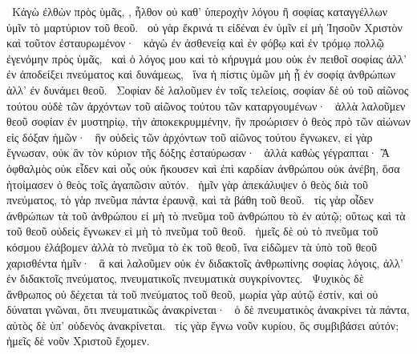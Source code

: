 ~Κἀγὼ ἐλθὼν πρὸς ὑμᾶς, , ἦλθον οὐ καθ’ ὑπεροχὴν λόγου ἢ σοφίας καταγγέλλων ὑμῖν τὸ μαρτύριον τοῦ θεοῦ.
~οὐ γὰρ ἔκρινά τι εἰδέναι ἐν ὑμῖν εἰ μὴ Ἰησοῦν Χριστὸν καὶ τοῦτον ἐσταυρωμένον·
~κἀγὼ ἐν ἀσθενείᾳ καὶ ἐν φόβῳ καὶ ἐν τρόμῳ πολλῷ ἐγενόμην πρὸς ὑμᾶς,
~καὶ ὁ λόγος μου καὶ τὸ κήρυγμά μου οὐκ ἐν πειθοῖ σοφίας ἀλλ’ ἐν ἀποδείξει πνεύματος καὶ δυνάμεως,
~ἵνα ἡ πίστις ὑμῶν μὴ ᾖ ἐν σοφίᾳ ἀνθρώπων ἀλλ’ ἐν δυνάμει θεοῦ.
~Σοφίαν δὲ λαλοῦμεν ἐν τοῖς τελείοις, σοφίαν δὲ οὐ τοῦ αἰῶνος τούτου οὐδὲ τῶν ἀρχόντων τοῦ αἰῶνος τούτου τῶν καταργουμένων·
~ἀλλὰ λαλοῦμεν θεοῦ σοφίαν ἐν μυστηρίῳ, τὴν ἀποκεκρυμμένην, ἣν προώρισεν ὁ θεὸς πρὸ τῶν αἰώνων εἰς δόξαν ἡμῶν·
~ἣν οὐδεὶς τῶν ἀρχόντων τοῦ αἰῶνος τούτου ἔγνωκεν, εἰ γὰρ ἔγνωσαν, οὐκ ἂν τὸν κύριον τῆς δόξης ἐσταύρωσαν·
~ἀλλὰ καθὼς γέγραπται· Ἃ ὀφθαλμὸς οὐκ εἶδεν καὶ οὖς οὐκ ἤκουσεν καὶ ἐπὶ καρδίαν ἀνθρώπου οὐκ ἀνέβη, ὅσα ἡτοίμασεν ὁ θεὸς τοῖς ἀγαπῶσιν αὐτόν.
~ἡμῖν γὰρ ἀπεκάλυψεν ὁ θεὸς διὰ τοῦ πνεύματος, τὸ γὰρ πνεῦμα πάντα ἐραυνᾷ, καὶ τὰ βάθη τοῦ θεοῦ.
~τίς γὰρ οἶδεν ἀνθρώπων τὰ τοῦ ἀνθρώπου εἰ μὴ τὸ πνεῦμα τοῦ ἀνθρώπου τὸ ἐν αὐτῷ; οὕτως καὶ τὰ τοῦ θεοῦ οὐδεὶς ἔγνωκεν εἰ μὴ τὸ πνεῦμα τοῦ θεοῦ.
~ἡμεῖς δὲ οὐ τὸ πνεῦμα τοῦ κόσμου ἐλάβομεν ἀλλὰ τὸ πνεῦμα τὸ ἐκ τοῦ θεοῦ, ἵνα εἰδῶμεν τὰ ὑπὸ τοῦ θεοῦ χαρισθέντα ἡμῖν·
~ἃ καὶ λαλοῦμεν οὐκ ἐν διδακτοῖς ἀνθρωπίνης σοφίας λόγοις, ἀλλ’ ἐν διδακτοῖς πνεύματος, πνευματικοῖς πνευματικὰ συγκρίνοντες.
~Ψυχικὸς δὲ ἄνθρωπος οὐ δέχεται τὰ τοῦ πνεύματος τοῦ θεοῦ, μωρία γὰρ αὐτῷ ἐστίν, καὶ οὐ δύναται γνῶναι, ὅτι πνευματικῶς ἀνακρίνεται·
~ὁ δὲ πνευματικὸς ἀνακρίνει τὰ πάντα, αὐτὸς δὲ ὑπ’ οὐδενὸς ἀνακρίνεται.
~τίς γὰρ ἔγνω νοῦν κυρίου, ὃς συμβιβάσει αὐτόν; ἡμεῖς δὲ νοῦν Χριστοῦ ἔχομεν.

